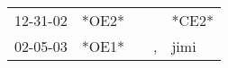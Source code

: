 \begin{supertabular}{p{0.07\textwidth}p{0.06\textwidth}p{0.02\textwidth}p{0.02\textwidth}p{0.06\textwidth}}
 12-31-02\textsuperscript{} &  *OE2* &   &    &                   *CE2* \\
 02-05-03\textsuperscript{} &  *OE1* &   &  , &  jimi\textsuperscript{} \\
\end{supertabular}
